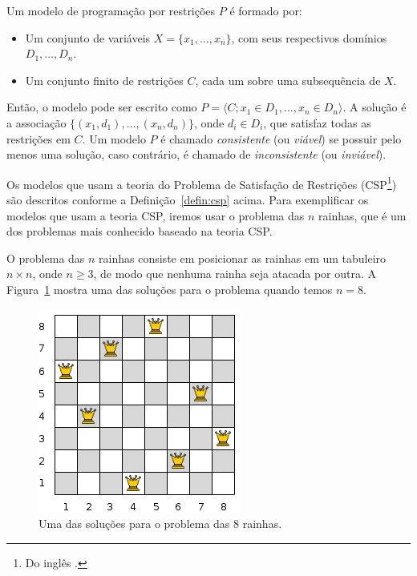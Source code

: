 \begin{defin}
\label{defin:csp}
Um modelo de programação por restrições $P$ é formado por:
\begin{itemize}
  \item{Um conjunto de variáveis $X = \{x_{1}, \ldots, x_{n}\}$, com
  seus respectivos domínios $D_{1}, \ldots, D_{n}$.}

  \item{Um conjunto finito de restrições $C$, cada um sobre uma
  subsequência de $X$.}
\end{itemize}
\end{defin}

Então, o modelo pode ser escrito como $P = \langle C; x_{1} \in
D_{1}, \ldots, x_{n} \in D_{n} \rangle$. A solução é a associação
$\{(x_{1}, d_{1}), \ldots, (x_{n}, d_{n})\}$, onde $d_{i} \in D_{i}$,
que satisfaz todas as restrições em $C$. Um modelo $P$ é
chamado \textit{consistente} (ou \textit{viável}) se possuir pelo
menos uma solução, caso contrário, é chamado de \textit{inconsistente}
(ou \textit{inviável}).

Os modelos que usam a teoria do Problema de Satisfação de Restrições
(CSP\footnote{Do inglês .}) são
descritos conforme a Definição~\ref{defin:csp} acima. Para exemplificar
os modelos que usam a teoria CSP, iremos usar o problema das $n$
rainhas, que é um dos problemas mais conhecido baseado na teoria CSP.

O problema das $n$ rainhas consiste em posicionar as rainhas em um
tabuleiro $n \times n$, onde $n \geq 3$, de modo que nenhuma rainha seja
atacada por outra. A Figura~\ref{fig:n-queens} mostra uma das soluções
para o problema quando temos $n = 8$.

\begin{figure}[h]
  \centering 
  \includegraphics[scale=1]{images/n-queens.png} 
  \caption{Uma das soluções para o problema das 8 rainhas.}
  \label{fig:n-queens}
\end{figure}

